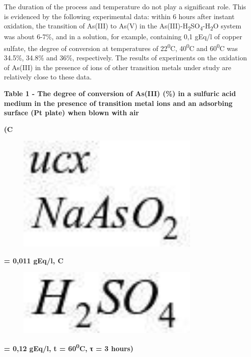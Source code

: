The duration of the process and temperature do not play a significant
role. This is evidenced by the following experimental data: within 6
hours after instant oxidation, the transition of As(III) to As(V) in the
As(III)-H\textsubscript{2}SO\textsubscript{4}-H\textsubscript{2}O system
was about 6-7\%, and in a solution, for example, containing 0,1 gEq/l of
copper sulfate, the degree of conversion at temperatures of
22\textsuperscript{0}C, 40\textsuperscript{0}C and
60\textsuperscript{0}C was 34.5\%, 34.8\% and 36\%, respectively. The
results of experiments on the oxidation of As(III) in the presence of
ions of other transition metals under study are relatively close to
these data.

{\bfseries Table 1 - The degree of conversion of As(III) (\%) in a sulfuric
acid medium in the presence of transition metal ions and an adsorbing
surface (Pt plate) when blown with air}

{\bfseries (C}\begin{figure}[H]
	\centering
	\includegraphics[width=0.8\textwidth]{assets/330}
	\caption*{}
\end{figure} {\bfseries = 0,011 gEq/l,
C}\begin{figure}[H]
	\centering
	\includegraphics[width=0.8\textwidth]{assets/331}
	\caption*{}
\end{figure} {\bfseries = 0,12 gEq/l, t =
60\textsuperscript{0}C, τ = 3 hours)}

